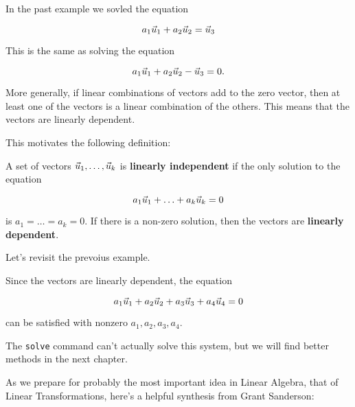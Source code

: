 \documentclass{ximera}
\begin{document}
\begin{exploration}
\begin{remark}
In the past example we sovled the equation

$$a_1\vec{u}_1+a_2\vec{u}_2=\vec{u}_3$$

This is the same as solving the equation

$$a_1\vec{u}_1+a_2\vec{u}_2-\vec{u}_3=0.$$

More generally, if linear combinations of vectors add to the zero vector, then at least one of the vectors is a linear combination of the others. This means that the vectors are linearly dependent.

This motivates the following definition:

\begin{definition}
  A set of vectors $\vec{u}_1,\ldots,\vec{u}_k$ is \textbf{linearly independent} if the only solution to the equation

  $$a_1\vec{u}_1+\ldots+a_k\vec{u}_k=0$$

  is $a_1=\ldots=a_k=0$. If there is a non-zero solution, then the vectors are \textbf{linearly dependent}.
\end{definition}

\begin{example}

  Let's revisit the prevoius example.

  Since the vectors are linearly dependent, the equation

  $$a_1\vec{u}_1+a_2\vec{u}_2+a_3\vec{u}_3+a_4\vec{u}_4=0$$

  can be satisfied with nonzero $a_1,a_2,a_3,a_4$.

  The \texttt{solve} command can't actually solve this system, but we will find better methods in the next chapter.
\end{example}

\end{remark}

\end{exploration}

As we prepare for probably the most important idea in Linear Algebra, that of Linear Transformations, here's a helpful synthesis from Grant Sanderson:

\end{document}

